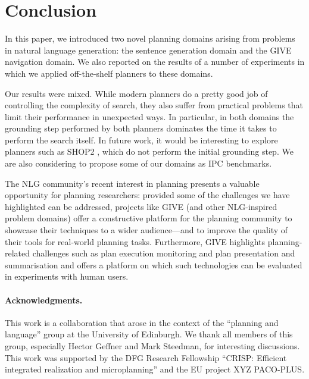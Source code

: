 \section{Conclusion} \label{sec:conclusion}

In this paper, we introduced two novel planning domains arising from
problems in natural language generation: the sentence generation
domain and the GIVE navigation domain. We also reported on the results
of a number of experiments in which we applied off-the-shelf planners
to these domains.

Our results were mixed. While modern planners do a pretty good job of
controlling the complexity of search, they also suffer from practical
problems that limit their performance in unexpected ways. In
particular, in both domains the grounding step performed by both
planners dominates the time it takes to perform the search itself. In
future work, it would be interesting to explore planners such as SHOP2
\cite{DBLP:journals/jair/NauAIKMWY03}, which do not perform the
initial grounding step.  We are also considering to propose some of
our domains as IPC benchmarks.

The NLG community's recent interest in planning presents a valuable
opportunity for planning researchers: provided some of the challenges
we have highlighted can be addressed, projects like GIVE (and other
NLG-inspired problem domains) offer a constructive platform for the
planning community to showcase their techniques to a wider
audience---and to improve the quality of their tools for real-world
planning tasks.  Furthermore, GIVE highlights planning-related
challenges such as plan execution monitoring and plan presentation
and summarisation and offers a platform on which such technologies can
be evaluated in experiments with human users.

\paragraph{Acknowledgments.} This work is a collaboration that arose
in the context of the ``planning and language'' group at the
University of Edinburgh.  We thank all members of this group,
especially Hector Geffner and Mark Steedman, for interesting
discussions.  This work was supported by the DFG Research Fellowship
``CRISP: Efficient integrated realization and microplanning'' and the
EU project XYZ PACO-PLUS.


